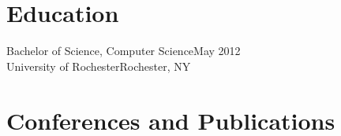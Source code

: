 \documentclass[oneside, final]{scrartcl}
\begin{document}
\begin{center}
\begin{comment}
    \textsc{Research Fellowship with Xerox\hfill Rochester, NY\\}
    \textsc{University of Rochester HCI Lab \hfill June 2011 - May 2012\\}
    \textsc{Research Fellowship with Xerox\hfill Rochester, NY\\}
    \begin{itemize}
      \setlength{\itemsep}{1pt}
      \setlength{\parskip}{0pt}
      \setlength{\parsep}{0pt}
      \setlength{\leftmargin}{-5mm}
          \item Researched crowd-sourced real-time audio transcription for hearing-impaired internet users.
          \item Developed a management application for Amazon Mechanical Turk which allowed faster iteration on experiments.
          \item Awarded Xerox Fellowship for contributions to real-time processing of crowd inputs.
          \item Participated in project planning, design, and development of services for gathering and retaining Amazon Mechanical Turk workers.
    \end{itemize}
\end{comment}

\section{Education}
Bachelor of Science, Computer Science\hfill May 2012\\
University of Rochester\hfill Rochester, NY\\

 \section{Conferences and Publications}
    
\begin{flushleft}




\end{flushleft}
\end{center}
\end{document}
